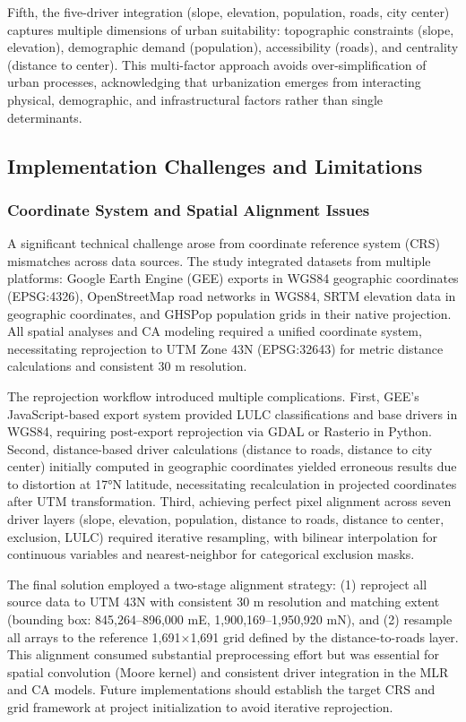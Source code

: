 \documentclass[conference]{IEEEtran}
\begin{document}
Fifth, the five-driver integration (slope, elevation, population, roads, city center) captures multiple dimensions of urban suitability: topographic constraints (slope, elevation), demographic demand (population), accessibility (roads), and centrality (distance to center). This multi-factor approach avoids over-simplification of urban processes, acknowledging that urbanization emerges from interacting physical, demographic, and infrastructural factors rather than single determinants.

\subsection{Implementation Challenges and Limitations}

\subsubsection{Coordinate System and Spatial Alignment Issues}

A significant technical challenge arose from coordinate reference system (CRS) mismatches across data sources. The study integrated datasets from multiple platforms: Google Earth Engine (GEE) exports in WGS84 geographic coordinates (EPSG:4326), OpenStreetMap road networks in WGS84, SRTM elevation data in geographic coordinates, and GHSPop population grids in their native projection. All spatial analyses and CA modeling required a unified coordinate system, necessitating reprojection to UTM Zone 43N (EPSG:32643) for metric distance calculations and consistent 30 m resolution.

The reprojection workflow introduced multiple complications. First, GEE's JavaScript-based export system provided LULC classifications and base drivers in WGS84, requiring post-export reprojection via GDAL or Rasterio in Python. Second, distance-based driver calculations (distance to roads, distance to city center) initially computed in geographic coordinates yielded erroneous results due to distortion at 17°N latitude, necessitating recalculation in projected coordinates after UTM transformation. Third, achieving perfect pixel alignment across seven driver layers (slope, elevation, population, distance to roads, distance to center, exclusion, LULC) required iterative resampling, with bilinear interpolation for continuous variables and nearest-neighbor for categorical exclusion masks.

The final solution employed a two-stage alignment strategy: (1) reproject all source data to UTM 43N with consistent 30 m resolution and matching extent (bounding box: 845,264--896,000 mE, 1,900,169--1,950,920 mN), and (2) resample all arrays to the reference 1,691$\times$1,691 grid defined by the distance-to-roads layer. This alignment consumed substantial preprocessing effort but was essential for spatial convolution (Moore kernel) and consistent driver integration in the MLR and CA models. Future implementations should establish the target CRS and grid framework at project initialization to avoid iterative reprojection.
\end{document}
